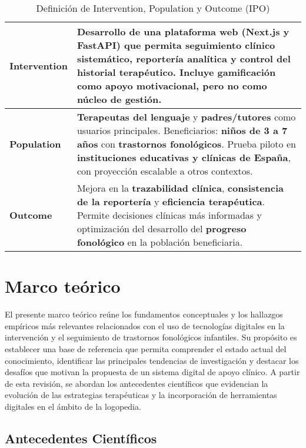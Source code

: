 \documentclass[12pt, oneside]{article}
\begin{document}
\begin{table}[H]
\centering
\caption{Definición de Intervention, Population y Outcome (IPO)}
\label{tab:ipo}
\begin{tabular}{p{3cm} p{11cm}}
\toprule
\textbf{Intervention} & Desarrollo de una \textbf{plataforma web} (Next.js y FastAPI) que permita \textbf{seguimiento clínico sistemático}, \textbf{reportería analítica} y control del \textbf{historial terapéutico}. Incluye \textbf{gamificación} como apoyo motivacional, pero no como núcleo de gestión. \\
\midrule
\textbf{Population} & \textbf{Terapeutas del lenguaje} y \textbf{padres/tutores} como usuarios principales. Beneficiarios: \textbf{niños de 3 a 7 años} con \textbf{trastornos fonológicos}. Prueba piloto en \textbf{instituciones educativas y clínicas de España}, con proyección escalable a otros contextos. \\
\midrule
\textbf{Outcome} & Mejora en la \textbf{trazabilidad clínica}, \textbf{consistencia de la reportería} y \textbf{eficiencia terapéutica}. Permite decisiones clínicas más informadas y optimización del desarrollo del \textbf{progreso fonológico} en la población beneficiaria. \\
\bottomrule
\end{tabular}
\end{table}


\section{Marco teórico}

El presente marco teórico reúne los fundamentos conceptuales y los hallazgos empíricos más relevantes relacionados con el uso de tecnologías digitales en la intervención y el seguimiento de trastornos fonológicos infantiles. Su propósito es establecer una base de referencia que permita comprender el estado actual del conocimiento, identificar las principales tendencias de investigación y destacar los desafíos que motivan la propuesta de un sistema digital de apoyo clínico. A partir de esta revisión, se abordan los antecedentes científicos que evidencian la evolución de las estrategias terapéuticas y la incorporación de herramientas digitales en el ámbito de la logopedia.

\subsection{Antecedentes Científicos}
\end{document}
